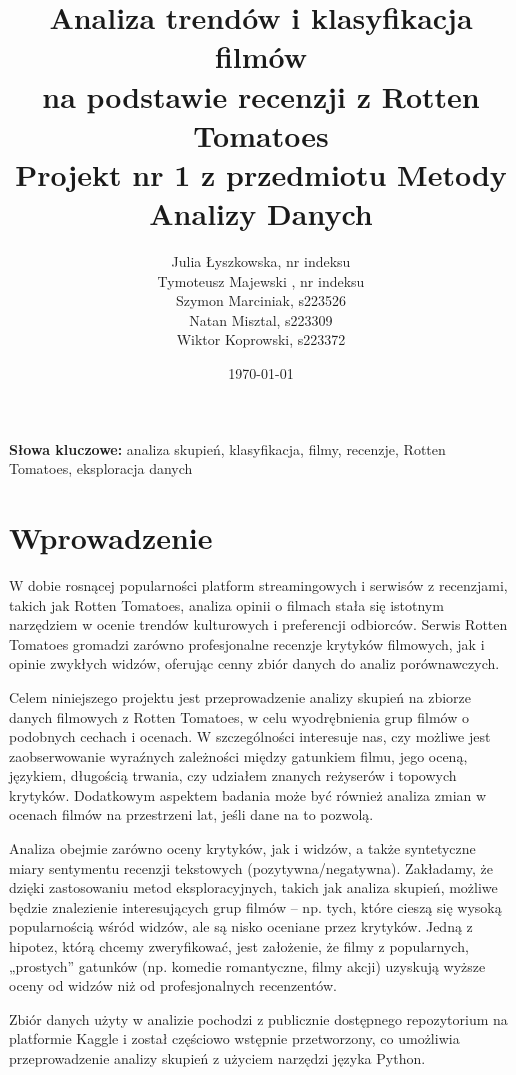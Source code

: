 \documentclass[a4paper,12pt]{article}
\title{Analiza trendów i klasyfikacja filmów\\na podstawie recenzji z Rotten Tomatoes\\\large Projekt nr 1 z przedmiotu Metody Analizy Danych}
\author{Julia Łyszkowska, nr indeksu\\Tymoteusz Majewski , nr indeksu\\Szymon Marciniak, s223526\\Natan Misztal, s223309\\Wiktor Koprowski, s223372}
\date{\today}
\begin{document}
\maketitle

\begin{abstract}
\end{abstract}

\noindent \textbf{Słowa kluczowe:} analiza skupień, klasyfikacja, filmy, recenzje, Rotten Tomatoes, eksploracja danych

\section{Wprowadzenie}

W dobie rosnącej popularności platform streamingowych i serwisów z recenzjami, takich jak Rotten Tomatoes, analiza opinii o filmach stała się istotnym narzędziem w ocenie trendów kulturowych i preferencji odbiorców. Serwis Rotten Tomatoes gromadzi zarówno profesjonalne recenzje krytyków filmowych, jak i opinie zwykłych widzów, oferując cenny zbiór danych do analiz porównawczych. 

Celem niniejszego projektu jest przeprowadzenie analizy skupień na zbiorze danych filmowych z Rotten Tomatoes, w celu wyodrębnienia grup filmów o podobnych cechach i ocenach. W szczególności interesuje nas, czy możliwe jest zaobserwowanie wyraźnych zależności między gatunkiem filmu, jego oceną, językiem, długością trwania, czy udziałem znanych reżyserów i topowych krytyków. Dodatkowym aspektem badania może być również analiza zmian w ocenach filmów na przestrzeni lat, jeśli dane na to pozwolą.

Analiza obejmie zarówno oceny krytyków, jak i widzów, a także syntetyczne miary sentymentu recenzji tekstowych (pozytywna/negatywna). Zakładamy, że dzięki zastosowaniu metod eksploracyjnych, takich jak analiza skupień, możliwe będzie znalezienie interesujących grup filmów – np. tych, które cieszą się wysoką popularnością wśród widzów, ale są nisko oceniane przez krytyków. Jedną z hipotez, którą chcemy zweryfikować, jest założenie, że filmy z popularnych, „prostych” gatunków (np. komedie romantyczne, filmy akcji) uzyskują wyższe oceny od widzów niż od profesjonalnych recenzentów.

Zbiór danych użyty w analizie pochodzi z publicznie dostępnego repozytorium na platformie Kaggle i został częściowo wstępnie przetworzony, co umożliwia przeprowadzenie analizy skupień z użyciem narzędzi języka Python.
\end{document}

